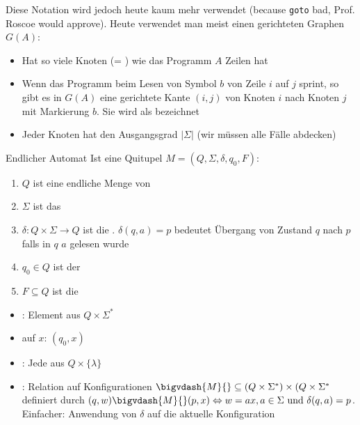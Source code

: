 Diese Notation wird jedoch heute kaum mehr verwendet (because \texttt{goto} bad, Prof. Roscoe would approve).
Heute verwendet man meist einen gerichteten Graphen $G(A)$:
\begin{itemize}
    \item Hat so viele Knoten (= ) wie das Programm $A$ Zeilen hat
    \item Wenn das Programm beim Lesen von Symbol $b$ von Zeile $i$ auf $j$ sprint, so gibt es in $G(A)$ eine gerichtete Kante $(i, j)$ von Knoten $i$ nach Knoten $j$ mit Markierung $b$. Sie wird als  bezeichnet
    \item Jeder Knoten hat den Ausgangsgrad $|\Sigma|$ (wir müssen alle Fälle abdecken)
\end{itemize}

\begin{definition}[]{Endlicher Automat}
    Ist eine Quitupel $M = (Q, \Sigma, \delta, q_0, F)$:
    \begin{enumerate}[label=\textit{(\roman*)}]
        \item $Q$ ist eine endliche Menge von 
        \item $\Sigma$ ist das 
        \item $\delta: Q \times \Sigma \rightarrow Q$ ist die . $\delta(q, a) = p$ bedeutet Übergang von Zustand $q$ nach $p$ falls in $q$ $a$ gelesen wurde
        \item $q_0 \in Q$ ist der 
        \item $F \subseteq Q$ ist die 
    \end{enumerate}
    \rmvspace
    \rmvspace
    \begin{multicols}{2}
        \begin{itemize}
            \item {}: Element aus $Q \times \Sigma^*$
            \item {} auf $x$: $(q_0, x)$
            \item {}: Jede aus $Q \times \{ \lambda \}$
        \end{itemize}
    \end{multicols}
    \rmvspace
    \rmvspace
    \begin{itemize}
        \item {}: Relation auf Konfigurationen $\bigvdash{M}{} \subseteq (Q \times \Sigma^*) \times (Q \times \Sigma^*$ definiert durch $(q, w) \bigvdash{M}{} (p, x) \Leftrightarrow w = ax, a \in \Sigma \text{ und } \delta(q, a) = p$. Einfacher: Anwendung von $\delta$ auf die aktuelle Konfiguration

\end{itemize}
\end{definition}
